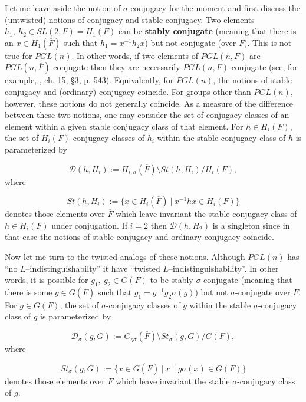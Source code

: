 \documentclass[12pt,letterpaper]{amsart}
\numberwithin{equation}{section}
\theoremstyle{definition}
\theoremstyle{plain}
\providecommand{\cal}{\mathcal}
\def\ddd{{\cal D}}
\def\ovF{\overline{F}}
\begin{document}
Let me leave aside the notion of $\sigma$-conjugacy for the moment
and first discuss the (untwisted) notions of conjugacy and
stable conjugacy. Two elements
$h_1,\ h_2 \in SL(2,F) = H_1(F)$ can be {\bf stably conjugate}
(meaning that there is an $x \in H_1(\ovF )$ such that
$h_1 = x^{-1}h_2x$) but not conjugate (over $F$). 
This is not true for $PGL(n)$. 
In other words, if two elements of $PGL(n,F)$ are
$PGL(n,\ovF )$-conjugate then they are necessarily
$PGL(n,F)$-conjugate (see, for example, \cite{La84}, ch. 15, \S 3, p. 543).
Equivalently, for $PGL(n)$, the notions of stable 
conjugacy and (ordinary) conjugacy coincide. 
For groups other than
$PGL(n)$, however, these notions do not generally coincide. 
As a measure of the 
difference between these two notions, one may consider the set
of conjugacy classes of an element within a given stable conjugacy class
of that element. 
For $h \in H_i(F)$, the set of $H_i(F)$-conjugacy
classes of $h_i$ within the stable conjugacy class of $h$ is parameterized 
by 

\begin{equation}
\label{eqn:1.19}
\ddd (h,H_i) := H_{i,h}(\ovF )\setminus St(h,H_i)/H_i(F),
\end{equation}
where

\[
St(h,H_i) := \{x \in H_i(\ovF )\ |\ x^{-1}hx \in H_i(F)\}
\]
denotes those elements over $\ovF$ which leave invariant the
stable conjugacy class of $h \in H_i(F)$ under conjugation. 
If $i = 2$ then
$\ddd (h,H_2)$ is a singleton since in that case the notions of 
stable conjugacy and ordinary conjugacy coincide. 
 
Now let me turn to the twisted analogs of these notions. Although
$PGL(n)$ has ``no $L$--indistinguishabilty'' it  have
``twisted 
\newline
$L$--indistinguishability''. In other words, it is
possible for $g_1,\ g_2 \in G(F)$ to be stably $\sigma$-conjugate
(meaning that there is some $g\in G(\ovF )$ such that
$g_1 = g^{-1}g_2\sigma (g)$) but not $\sigma$-conjugate over $F$.
For $g \in G(F)$, the set of $\sigma$-conjugacy classes of $g$ within the
stable $\sigma$-conjugacy class of $g$ is parameterized by

\begin{equation}
\label{eqn:1.20}
\ddd_{\sigma}(g,G) := G_{g\sigma}(\ovF)\setminus St_{\sigma}(g,G)/G(F),
\end{equation}
where

\[
St_{\sigma}(g,G) := \{x \in G(\ovF )\ |\ x^{-1}g\sigma(x) \in G(F)\}
\]
denotes those elements over $\ovF$ which leave invariant the 
stable $\sigma$-conjugacy class of $g$.
\end{document}
